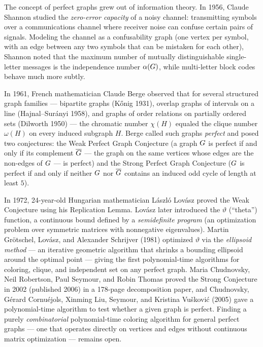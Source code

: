 \begin{historybox}
The concept of perfect graphs grew out of information theory. In 1956, Claude Shannon
studied the \emph{zero-error capacity} of a noisy
channel: transmitting symbols over a communications channel where receiver noise can
confuse certain pairs of signals. Modeling the channel as a confusability graph (one vertex
per symbol, with an edge between any two symbols that can be mistaken for each other),
Shannon noted that the maximum number of mutually distinguishable single-letter messages is
the independence number $\alpha(G)$, while multi-letter block codes behave much more subtly.

In 1961, French mathematician Claude Berge observed that for several structured graph
families --- bipartite graphs (K\H{o}nig 1931), overlap graphs of intervals on a line
(Hajnal--Sur\'anyi 1958), and graphs of order relations on partially ordered sets
(Dilworth 1950) --- the chromatic number $\chi(H)$
equaled the clique number $\omega(H)$ on every induced subgraph $H$.
Berge called such graphs \emph{perfect} and posed two conjectures: the Weak
Perfect Graph Conjecture (a graph $G$ is perfect if and only if its complement
$\overline{G}$ --- the graph on the same vertices whose edges are the non-edges of $G$ ---
is perfect) and the Strong Perfect Graph Conjecture ($G$ is perfect if and only if neither
$G$ nor $\overline{G}$ contains an induced odd cycle of length at least $5$).

In 1972, 24-year-old Hungarian mathematician L{\'a}szl{\'o} Lov{\'a}sz proved the Weak
Conjecture using his Replication Lemma. Lov\'asz later introduced the $\vartheta$ (``theta'')
function, a continuous bound defined by a \emph{semidefinite program} (an optimization problem
over symmetric matrices with nonnegative eigenvalues). Martin Gr{\"o}tschel, Lov{\'a}sz, and
Alexander Schrijver (1981) optimized $\vartheta$ via the \emph{ellipsoid method} --- an iterative
geometric algorithm that shrinks a bounding ellipsoid around the optimal point --- giving
the first polynomial-time algorithms for coloring, clique, and independent set on any perfect
graph. Maria Chudnovsky, Neil Robertson, Paul Seymour, and Robin Thomas proved the Strong
Conjecture in 2002 (published 2006) in a 178-page decomposition paper, and Chudnovsky,
G{\'e}rard Cornu{\'e}jols, Xinming Liu, Seymour, and Kristina Vu{\v{s}}kovi{\'c} (2005) gave a
polynomial-time algorithm to test whether a given graph is perfect. Finding a purely
\emph{combinatorial} polynomial-time coloring algorithm for general perfect graphs --- one that
operates directly on vertices and edges without continuous matrix optimization --- remains open.
\end{historybox}

